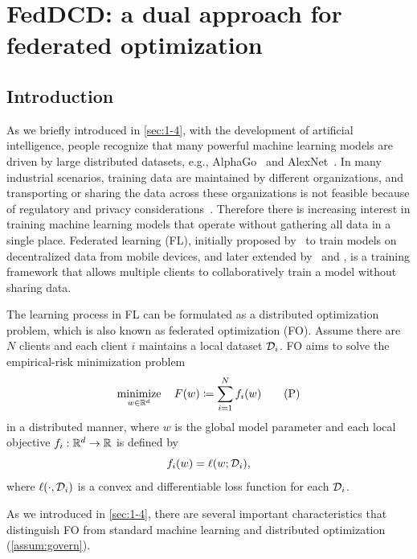 \chapter{FedDCD: a dual approach for federated optimization}
\label{ch:Dual-Fed-Opt}

\section{Introduction} \label{sec:6-1}

As we briefly introduced in \autoref{sec:1-4}, with the development of artificial intelligence, people recognize that many powerful machine learning models are driven by large distributed datasets, e.g., AlphaGo~\citep{silver2016mastering} and AlexNet~\citep{krizhevsky2012imagenet}. In many industrial scenarios, training data are maintained by different organizations, and transporting or sharing the data across these organizations is not feasible because of regulatory and privacy considerations~\citep{li2020review}. Therefore there is increasing interest in training machine learning models that operate without gathering all data in a single place. Federated learning (FL), initially proposed by~\citet{mcmahan2017communication} to train models on decentralized data from mobile devices, and later extended by~\citet{yang2019federated} and \citet{kairouz2019advances}, is a training framework that allows multiple clients to collaboratively train a model without sharing data. 

The learning process in FL can be formulated as a distributed optimization problem, which is also known as federated optimization (FO). Assume there are $N$ clients and each client $i$ maintains a local dataset $\mathcal{D}_i$. FO aims to solve the  empirical-risk minimization problem
\begin{equation} \label{eq:primal}
  \displaystyle\mathop{\hbox{\rm minimize}}_{w\in\mathbb{R}^d}\enspace\enspace F(w) \coloneqq \sum_{i = 1}^N f_i(w) \tag{P}
\end{equation}
in a distributed manner, where $w$ is the global model parameter and each local objective $f_i:\mathbb{R}^d \to\mathbb{R}$ is defined by 
\begin{equation*} %
    f_i(w) = \ell(w; \Dscr_i),
\end{equation*}
where $\ell(\cdot, \mathcal{D}_i)$ is a convex and differentiable loss function for each $\mathcal{D}_i$. 

As we introduced in \autoref{sec:1-4}, there are several important characteristics that distinguish FO from standard machine learning and distributed optimization (\autoref{assum:govern}). 

